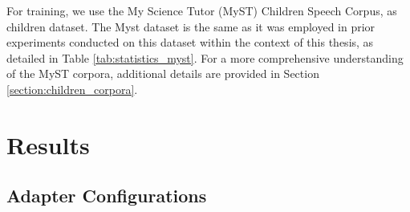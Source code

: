 For training, we use the My Science Tutor (MyST) Children Speech Corpus, as children dataset. The Myst dataset is the same as it was employed in prior experiments conducted on this dataset within the context of this thesis, as detailed in Table \ref{tab:statistics_myst}. For a more comprehensive understanding of the MyST corpora, additional details are provided in Section \ref{section:children_corpora}.


\section{Results}
\label{sec:results_adapters}

\subsection{Adapter Configurations}
